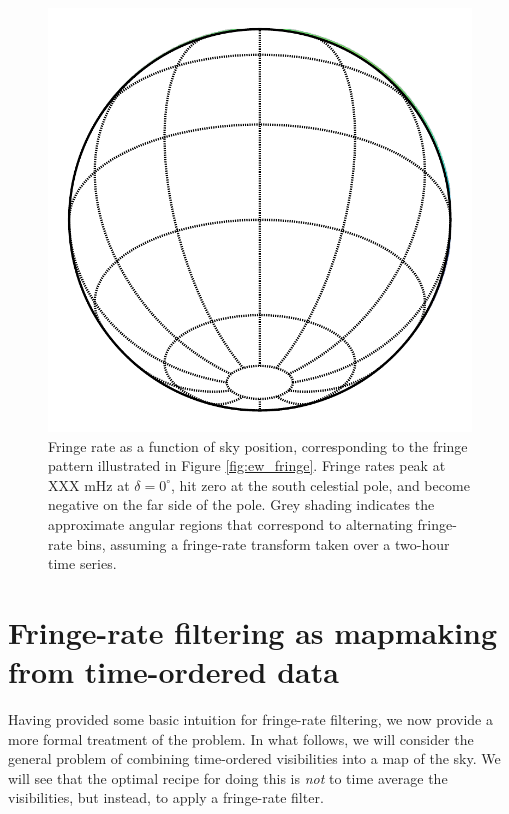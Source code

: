 \documentclass[twocolumn,apj,numberedappendix]{emulateapj}
\begin{document}
\begin{figure}
\includegraphics[width=.9\columnwidth]{plots/fringe_contours}
\caption{
Fringe rate as a function of sky position, corresponding to the fringe pattern illustrated in
Figure \ref{fig:ew_fringe}.  Fringe rates peak at XXX mHz at $\delta=0^\circ$, hit zero at
the south celestial pole, and become negative on the far side of the pole.  Grey shading indicates
the approximate angular regions that correspond to alternating fringe-rate bins, assuming a
fringe-rate transform taken over a two-hour time series.
}\label{fig:fringe_contours}
\end{figure}


\section{Fringe-rate filtering as mapmaking from time-ordered data}

Having provided some basic intuition for fringe-rate filtering, we now provide
a more formal treatment of the problem. In what follows, we will consider the
general problem of combining time-ordered visibilities into a map of the sky.
We will see that the optimal recipe for doing this is \emph{not} to time average
the visibilities, but instead, to apply a fringe-rate filter.

\end{document}
